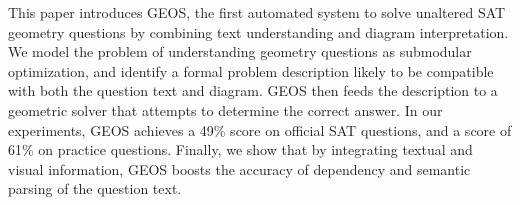 This paper introduces GEOS, the first automated system to solve unaltered SAT geometry questions by combining text understanding and diagram interpretation. We model the problem of understanding geometry questions as submodular optimization, and identify a formal problem description likely to be compatible with both the question text and diagram. GEOS then feeds the description to a geometric solver that attempts to determine the correct answer. In our experiments, GEOS achieves a 49\% score on official SAT questions, and a score of 61\% on practice questions. Finally, we show that by integrating textual and visual information, GEOS boosts the accuracy of dependency and semantic parsing of the question text.
